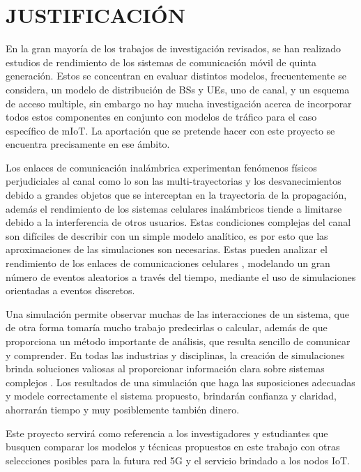\section{JUSTIFICACIÓN}

En la gran mayoría de los trabajos de investigación revisados, se han realizado estudios de rendimiento de los sistemas de comunicación móvil de quinta generación. Estos se concentran en evaluar distintos modelos, frecuentemente se considera, un modelo de distribución de BSs y UEs, uno de canal, y un esquema de acceso multiple, sin embargo no hay mucha investigación acerca de incorporar todos estos componentes en conjunto con modelos de tráfico para el caso específico de mIoT. La aportación que se pretende hacer con este proyecto se encuentra precisamente en ese ámbito.\newline

Los enlaces de comunicación inalámbrica experimentan fenómenos físicos perjudiciales al canal como lo son las multi-trayectorias y los desvanecimientos debido a grandes objetos que se interceptan en la trayectoria de la propagación, además el rendimiento de los sistemas celulares inalámbricos tiende a limitarse debido a la interferencia de otros usuarios. Estas condiciones complejas del canal son difíciles de describir con un simple modelo analítico, es por esto que las aproximaciones de las simulaciones son necesarias. Estas pueden analizar el rendimiento de los enlaces de comunicaciones celulares \parencite{WirelessSim}, modelando un gran número de eventos aleatorios a través del tiempo, mediante el uso de simulaciones orientadas a eventos discretos. \newline

Una simulación permite observar muchas de las interacciones de un sistema, que de otra forma tomaría mucho trabajo predecirlas o calcular, además de que proporciona un método importante de análisis, que resulta sencillo de comunicar y comprender. En todas las industrias y disciplinas, la creación de simulaciones brinda soluciones valiosas al proporcionar información clara sobre sistemas complejos \parencite{WirelessSim}. Los resultados de una simulación que haga las suposiciones adecuadas y modele correctamente el sistema propuesto, brindarán confianza y claridad, ahorrarán tiempo y muy posiblemente también dinero.\newline

Este proyecto servirá como referencia a los investigadores y estudiantes que busquen comparar los modelos y técnicas propuestos en este trabajo con otras selecciones posibles para la futura red 5G y el servicio brindado a los nodos IoT.\newline

